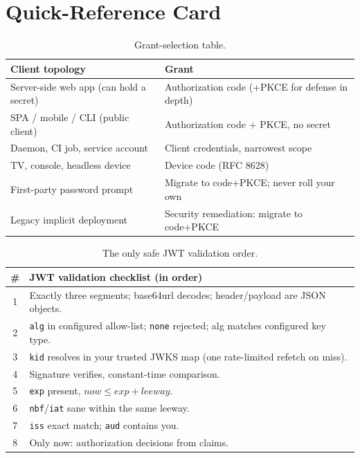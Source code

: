\section{Quick-Reference Card}
\label{sec:ch5-quickref}

\begin{table}[ht]
\centering\small
\begin{tabularx}{\textwidth}{l X}
\toprule
\textbf{Client topology} & \textbf{Grant} \\
\midrule
Server-side web app (can hold a secret) & Authorization code (+PKCE for defense in depth) \\
SPA / mobile / CLI (public client) & Authorization code + PKCE, no secret \\
Daemon, CI job, service account & Client credentials, narrowest scope \\
TV, console, headless device & Device code (RFC 8628) \\
First-party password prompt & Migrate to code+PKCE; never roll your own \\
Legacy implicit deployment & Security remediation: migrate to code+PKCE \\
\bottomrule
\end{tabularx}
\caption{Grant-selection table.}
\label{tab:ch5-grants}
\end{table}

\begin{table}[ht]
\centering\small
\begin{tabularx}{\textwidth}{c X}
\toprule
\textbf{\#} & \textbf{JWT validation checklist (in order)} \\
\midrule
1 & Exactly three segments; base64url decodes; header/payload are JSON objects. \\
2 & \texttt{alg} in configured allow-list; \texttt{none} rejected; alg matches configured key type. \\
3 & \texttt{kid} resolves in your trusted JWKS map (one rate-limited refetch on miss). \\
4 & Signature verifies, constant-time comparison. \\
5 & \texttt{exp} present, $\textit{now} \le \textit{exp} + \textit{leeway}$. \\
6 & \texttt{nbf}/\texttt{iat} sane within the same leeway. \\
7 & \texttt{iss} exact match; \texttt{aud} contains you. \\
8 & Only now: authorization decisions from claims. \\
\bottomrule
\end{tabularx}
\caption{The only safe JWT validation order.}
\label{tab:ch5-jwtcheck}
\end{table}

